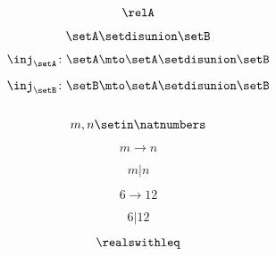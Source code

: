 {\begin{forslides}
        \begin{equation}
            \label{eq:combination-120}
            \relA
        \end{equation}

        \begin{equation}
            \label{eq:combination-121}
            \setA \setdisunion \setB
        \end{equation}

        \begin{equation}
            \label{eq:combination-122}
            \inj_\setA\colon \setA\mto \setA \setdisunion\setB
        \end{equation}

        \begin{equation}
            \label{eq:combination-123}
            \inj_\setB\colon \setB\mto \setA \setdisunion\setB
        \end{equation}

        \begin{equation}
            \label{eq:combination-124}
        \end{equation}

        \begin{equation}
            \label{eq:combination-125}
            m,n\setin \natnumbers
        \end{equation}

        \begin{equation}
            \label{eq:combination-126}
            m\to n
        \end{equation}

        \begin{equation}
            \label{eq:combination-127}
            m | n
        \end{equation}

        \begin{equation}
            \label{eq:combination-128}
            6\to 12
        \end{equation}

        \begin{equation}
            \label{eq:combination-129}
            6 | 12
        \end{equation}

        \begin{equation}
            \label{eq:combination-130}
            \realswithleq
        \end{equation}


\end{forslides}}
